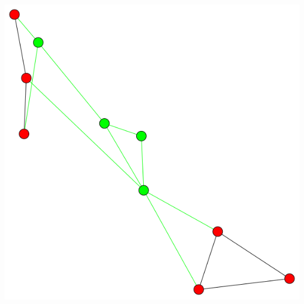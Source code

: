 \documentclass[12pt]{article}
\begin{document}
\begin{minipage}[t]{0.3\textwidth}
\includegraphics[width=\textwidth]{cascadeHomo/cascade1.png}
\end{minipage}
\end{document}
